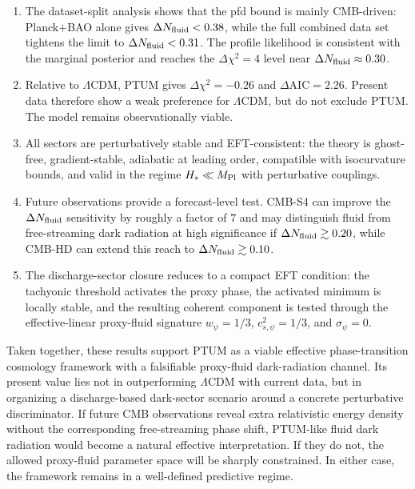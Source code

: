 \documentclass[epj]{svjour}
\begin{document}
\begin{enumerate}[label=(\arabic*)]
\item The dataset-split analysis shows that the pfd bound is mainly
      CMB-driven: Planck$+$BAO alone gives
      $\Delta N_{\rm fluid}<0.38$, while the full combined data
      set tightens the limit to $\Delta N_{\rm fluid}<0.31$.
      The profile likelihood is consistent with the marginal
      posterior and reaches the $\Delta\chi^2=4$ level near
      $\Delta N_{\rm fluid}\approx0.30$.

\item Relative to $\Lambda$CDM, PTUM gives
      $\Delta\chi^2=-0.26$ and
      $\Delta\mathrm{AIC}=2.26$. Present data therefore show a
      weak preference for $\Lambda$CDM, but do not exclude PTUM.
      The model remains observationally viable.

\item All sectors are perturbatively stable and EFT-consistent:
      the theory is ghost-free, gradient-stable, adiabatic at
      leading order, compatible with isocurvature bounds, and valid
      in the regime $H_* \ll M_{\rm Pl}$ with perturbative
      couplings.

\item Future observations provide a forecast-level test. CMB-S4 can
      improve the $\Delta N_{\rm fluid}$ sensitivity by roughly a
      factor of $7$ and may distinguish fluid from free-streaming dark
      radiation at high significance if
      $\Delta N_{\rm fluid}\gtrsim0.20$, while CMB-HD can extend
      this reach to $\Delta N_{\rm fluid}\gtrsim0.10$.
\item The discharge-sector closure reduces to a compact EFT condition:
      the tachyonic threshold activates the proxy phase, the activated minimum
      is locally stable, and the resulting coherent component is tested through
      the effective-linear proxy-fluid signature $w_\psi=1/3$,
      $c_{s,\psi}^2=1/3$, and $\sigma_\psi=0$.
\end{enumerate}

Taken together, these results support PTUM as a viable effective
phase-transition cosmology framework with a falsifiable proxy-fluid
dark-radiation channel. Its present value lies not in outperforming
$\Lambda$CDM with current data, but in organizing a discharge-based dark-sector
scenario around a concrete perturbative discriminator. If future CMB
observations reveal extra relativistic energy density without the corresponding
free-streaming phase shift, PTUM-like fluid dark radiation would become a
natural effective interpretation. If they do not, the allowed proxy-fluid
parameter space will be sharply constrained. In either case, the framework
remains in a well-defined predictive regime.
\end{document}
